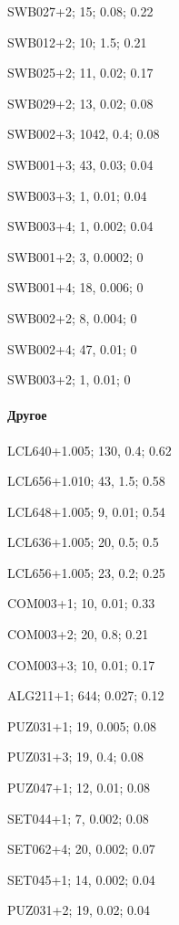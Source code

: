 SWB027+2; 15; 0.08; 0.22

SWB012+2; 10; 1.5; 0.21

SWB025+2; 11, 0.02; 0.17

SWB029+2; 13, 0.02; 0.08

SWB002+3; 1042, 0.4; 0.08

SWB001+3; 43, 0.03; 0.04

SWB003+3; 1, 0.01; 0.04

SWB003+4; 1, 0.002; 0.04

SWB001+2; 3, 0.0002; 0

SWB001+4; 18, 0.006; 0

SWB002+2; 8, 0.004; 0

SWB002+4; 47, 0.01; 0

SWB003+2; 1, 0.01; 0




\paragraph{Другое}








LCL640+1.005; 130, 0.4; 0.62

LCL656+1.010; 43, 1.5; 0.58

LCL648+1.005; 9, 0.01; 0.54

LCL636+1.005; 20, 0.5; 0.5

LCL656+1.005; 23, 0.2; 0.25




COM003+1; 10, 0.01; 0.33

COM003+2; 20, 0.8; 0.21

COM003+3; 10, 0.01; 0.17

ALG211+1; 644; 0.027; 0.12

PUZ031+1; 19, 0.005; 0.08

PUZ031+3; 19, 0.4; 0.08

PUZ047+1; 12, 0.01; 0.08

SET044+1; 7, 0.002; 0.08

SET062+4; 20, 0.002; 0.07

SET045+1; 14, 0.002; 0.04

PUZ031+2; 19, 0.02; 0.04

